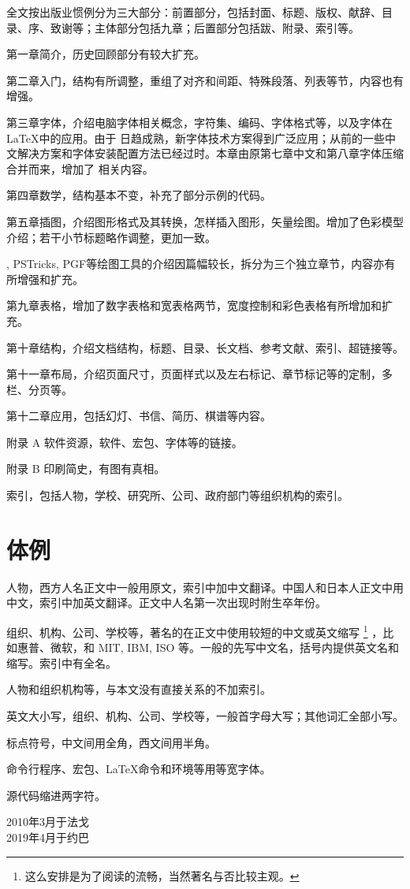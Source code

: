 \begin{compactenum}
  \item 全文按出版业惯例分为三大部分：前置部分，包括封面、标题、版权、献辞、目录、序、致谢等；主体部分包括九章；后置部分包括跋、附录、索引等。
  \item 第一章简介，历史回顾部分有较大扩充。
  \item 第二章入门，结构有所调整，重组了对齐和间距、特殊段落、列表等节，内容也有增强。
  \item 第三章字体，介绍电脑字体相关概念，字符集、编码、字体格式等，以及字体在 \LaTeX 中的应用。由于 \XeTeX 日趋成熟，新字体技术方案得到广泛应用；从前的一些中文解决方案和字体安装配置方法已经过时。本章由原第七章中文和第八章字体压缩合并而来，增加了 \XeTeX 相关内容。
  \item 第四章数学，结构基本不变，补充了部分示例的代码。
  \item 第五章插图，介绍图形格式及其转换，怎样插入图形，矢量绘图。增加了色彩模型介绍；若干小节标题略作调整，更加一致。
  \item \MP, PSTricks, PGF等绘图工具的介绍因篇幅较长，拆分为三个独立章节，内容亦有所增强和扩充。
  \item 第九章表格，增加了数字表格和宽表格两节，宽度控制和彩色表格有所增加和扩充。
  \item 第十章结构，介绍文档结构，标题、目录、长文档、参考文献、索引、超链接等。
  \item 第十一章布局，介绍页面尺寸，页面样式以及左右标记、章节标记等的定制，多栏、分页等。
  \item 第十二章应用，包括幻灯、书信、简历、棋谱等内容。
  \item 附录 A 软件资源，软件、宏包、字体等的链接。
  \item 附录 B 印刷简史，有图有真相。
  \item 索引，包括人物，学校、研究所、公司、政府部门等组织机构的索引。
\end{compactenum}

\section*{体例}

\begin{compactenum}
  \item 人物，西方人名正文中一般用原文，索引中加中文翻译。中国人和日本人正文中用中文，索引中加英文翻译。正文中人名第一次出现时附生卒年份。
  \item 组织、机构、公司、学校等，著名的在正文中使用较短的中文或英文缩写 \footnote{这么安排是为了阅读的流畅，当然著名与否比较主观。} ，比如惠普、微软，和 MIT, IBM, ISO 等。一般的先写中文名，括号内提供英文名和缩写。索引中有全名。
  \item 人物和组织机构等，与本文没有直接关系的不加索引。
  \item 英文大小写，组织、机构、公司、学校等，一般首字母大写；其他词汇全部小写。
  \item 标点符号，中文间用全角，西文间用半角。
  \item 命令行程序、宏包、\LaTeX 命令和环境等用等宽字体。
  \item 源代码缩进两字符。
\end{compactenum}

\begin{flushright}
  2010年3月于法戈\\
  2019年4月于约巴
\end{flushright}
